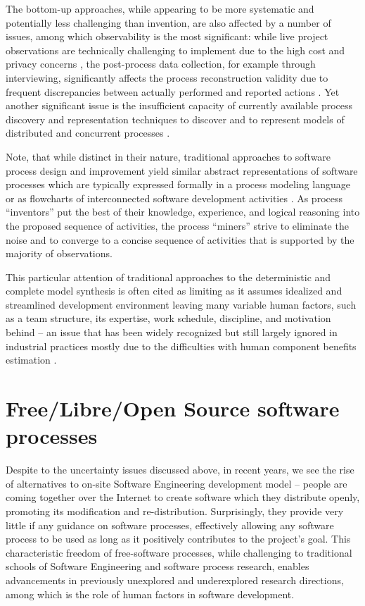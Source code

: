 The bottom-up approaches, while appearing to be more systematic and potentially less challenging than invention, 
are also affected by a number of issues, among which observability is the most significant: 
while live project observations are technically challenging to implement due to the high cost and 
privacy concerns \cite{citeulike:12944447}, the post-process data collection, for example through interviewing, 
significantly affects the process reconstruction validity due to frequent discrepancies between actually 
performed and reported actions \cite{citeulike:7691059}. 
Yet another significant issue is the insufficient capacity of currently available process discovery and 
representation techniques to discover and to represent models of distributed and concurrent processes 
\cite{citeulike:12944447}. 

Note, that while distinct in their nature, traditional approaches to software process design and 
improvement yield similar abstract representations of software processes which are typically expressed 
formally in a process modeling language or as flowcharts of interconnected software 
development activities \cite{citeulike:12944447} \cite{citeulike:12944456}.
As process ``inventors'' put the best of their knowledge, experience, and logical reasoning into the proposed 
sequence of activities, the process ``miners'' strive to eliminate the noise and to converge to a 
concise sequence of activities that is supported by the majority of observations. 

This particular attention of traditional approaches to the deterministic and complete model synthesis 
is often cited as limiting as it assumes idealized and streamlined development environment leaving many variable 
human factors, such as a team structure, its expertise, work schedule, discipline, and motivation behind -- 
an issue that has been widely recognized 
\cite{citeulike:149387} \cite{citeulike:113403} \cite{citeulike:205322} \cite{citeulike:12798652}
but still largely ignored in industrial practices mostly due to the  difficulties with human component 
benefits estimation \cite{citeulike:12798659} \cite{citeulike:12798662} \cite{csdl2-12-11}.

%
%
\section{Free/Libre/Open Source software processes}
Despite to the uncertainty issues discussed above, in recent years, we see the rise of alternatives to on-site 
Software Engineering development model -- people are coming together over the Internet to create software 
which they distribute openly, promoting its modification and re-distribution. 
Surprisingly, they provide very little if any guidance on software processes, effectively allowing any 
software process to be used as long as it positively contributes to the project's goal. 
This characteristic freedom of free-software processes, while challenging to traditional schools of 
Software Engineering and software process research, enables advancements in previously unexplored 
and underexplored research directions, among which is the role of human factors in software development.

